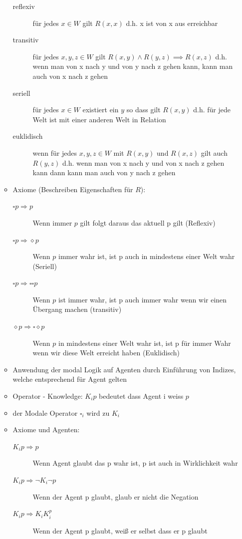 \documentclass{article} %
\begin{document}
\begin{itemize}
\begin{itemize}
			\begin{description}
				\item[reflexiv] für jedes $x \in W$ gilt $R(x,x)$ d.h. x ist von x aus erreichbar
				\item[transitiv] für jedes $x,y,z \in W$ gilt $R(x,y) \wedge R(y,z) \implies R(x,z)$ d.h. wenn man von x nach y und von y nach z gehen kann, kann man auch von x nach z gehen
				\item[seriell] für jedes $x \in W$ existiert ein $y$ so dass gilt $R(x,y)$ d.h. für jede Welt ist mit einer anderen Welt in Relation
				\item[euklidisch] wenn für jedes $x,y,z \in W$ mit $R(x,y)$ und $R(x,z)$ gilt auch $R(y,z)$ d.h. wenn man von x nach y und von x nach z gehen kann dann kann man auch von y nach z gehen 
			\end{description}
			\item Axiome (Beschreiben Eigenschaften für $R$):
			\begin{description}
				\item[$\square p \Rightarrow p$] Wenn immer $p$ gilt folgt daraus das aktuell p gilt (Reflexiv)
				\item[$\square p \Rightarrow \diamond p$] Wenn $p$ immer wahr ist, ist p auch in mindestens einer Welt wahr (Seriell)
				\item[$\square p \Rightarrow \square \square p$] Wenn $p$ ist immer wahr, ist p auch immer wahr wenn wir einen Übergang machen (transitiv)
				\item[$\diamond p \Rightarrow \square \diamond p$] Wenn $p$ in mindestens einer Welt wahr ist, ist p für immer Wahr wenn wir diese Welt erreicht haben (Euklidisch)
			\end{description}
			\item Anwendung der modal Logik auf Agenten durch Einführung von Indizes, welche entsprechend für Agent gelten
			\item Operator - Knowledge: $K_ip$ bedeutet dass Agent i weiss $p$
			\item der Modale Operator $\square_i$ wird zu $K_i$
			\item Axiome und Agenten:
			\begin{description}
				\item[$K_{i}p \Rightarrow p$] Wenn Agent glaubt das p wahr ist, p ist auch in Wirklichkeit wahr
				\item[$K_{i}p \Rightarrow \neg K_{i}\neg p$] Wenn der Agent p glaubt, glaub er nicht die Negation
				\item[$K_{i}p \Rightarrow K_{i}K_{i}^p$] Wenn der Agent p glaubt, weiß er selbst dass er p glaubt

\end{description}
\end{itemize}
\end{itemize}
\end{document}
